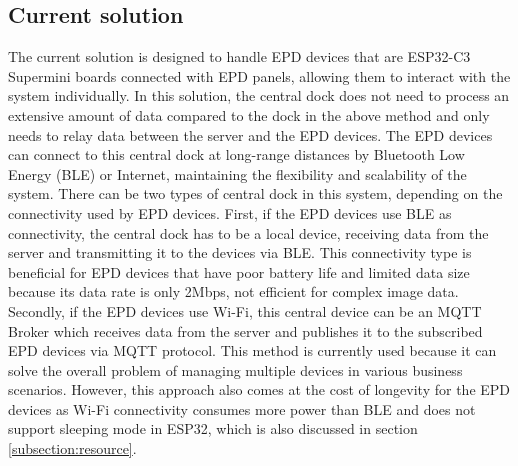 \documentclass[../Main.tex]{subfiles}
\begin{document}
\subsection{Current solution}
The current solution is designed to handle \gls{EPD} devices that are ESP32-C3 Supermini boards connected with \gls{EPD} panels, allowing them to interact with the system individually. In this solution, the central dock does not need to process an extensive amount of data compared to the dock in the above method and only needs to relay data between the server and the \gls{EPD} devices. The \gls{EPD} devices can connect to this central dock at long-range distances by Bluetooth Low Energy (BLE) or Internet, maintaining the flexibility and scalability of the system. There can be two types of central dock in this system, depending on the connectivity used by \gls{EPD} devices. First, if the \gls{EPD} devices use BLE as connectivity, the central dock has to be a local device, receiving data from the server and transmitting it to the devices via BLE. This connectivity type is beneficial for \gls{EPD} devices that have poor battery life and limited data size because its data rate is only 2Mbps, not efficient for complex image data. Secondly, if the \gls{EPD} devices use Wi-Fi, this central device can be an MQTT Broker which receives data from the server and publishes it to the subscribed \gls{EPD} devices via MQTT protocol. This method is currently used because it can solve the overall problem of managing multiple devices in various business scenarios. However, this approach also comes at the cost of longevity for the \gls{EPD} devices as Wi-Fi connectivity consumes more power than BLE and does not support sleeping mode in ESP32, which is also discussed in section \ref{subsection:resource}.
\end{document}
